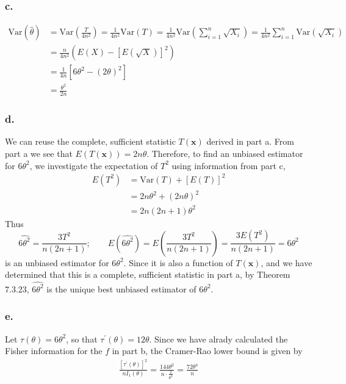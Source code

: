 \documentclass{article}
\begin{document}
\subsubsection*{c.}
\begin{align*}
\mathrm{Var}(\hat{\theta}) &= \mathrm{Var}\left(\frac{T}{4n^2}\right) = \frac{1}{4n^2}\mathrm{Var}(T) = \frac{1}{4n^2}\mathrm{Var}\left(\sum_{i=1}^n \sqrt{X_i}\right) = \frac{1}{4n^2}\sum_{i=1}^n \mathrm{Var}(\sqrt{X_i})\\
&=\frac{n}{4n^2}\left(E(X)-\left[E(\sqrt{X})\right]^2\right) \\
&=\frac{1}{4n}\left[6\theta^2-(2\theta)^2\right] \\
&= \frac{\theta^2}{2n}
\end{align*}

\subsubsection*{d.}
We can reuse the complete, sufficient statistic $T(\mathbf{x})$ derived in part a. From part a we see that 
$E\left(T(\mathbf{x})\right)=2n\theta$.
Therefore, to find an unbiased estimator for $6\theta^2$, we investigate the expectation of $T^2$ using information from part c,
\begin{align*}
E\left(T^2\right) &= \mathrm{Var}(T) + \left[E(T)\right]^2 \\
&=2n\theta^2 + (2n\theta)^2 \\
&=2n(2n+1)\theta^2
\end{align*}
Thus \[\widehat{6\theta^2} = \frac{3T^2}{n(2n+1)}; \qquad E\left(\widehat{6\theta^2}\right) = E\left(\frac{3T^2}{n(2n+1)}\right) = \frac{3E\left(T^2\right)}{n(2n+1)} = 6\theta^2\] 
is an unbiased estimator for $6\theta^2$. Since it is also a function of $T(\mathbf{x})$, and we have determined that this is a complete, sufficient statistic in part a, by Theorem 7.3.23, $\widehat{6\theta^2}$ is the unique best unbiased estimator of $6\theta^2$.

\pagebreak
\subsubsection*{e.}
Let $\tau(\theta) = 6\theta^2$, so that $\tau^\prime(\theta) = 12\theta$. Since we have alrady calculated the Fisher information for the $f$ in part b, the Cramer-Rao lower bound is given by 
\begin{align*}
\frac{\left[\tau^\prime(\theta)\right]^2}{nI_1(\theta)} = \frac{144\theta^2}{n\cdot\frac{2}{\theta^2}} = \frac{72\theta^4}{n}
\end{align*}
\end{document}
